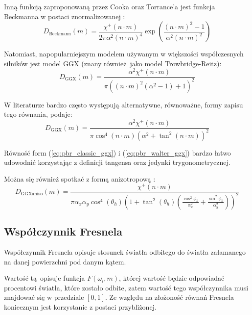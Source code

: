\documentclass[../main.tex]{subfiles}
\begin{document}
Inną funkcją zaproponowaną przez Cooka oraz Torrance'a jest funkcja Beckmanna \cite{CookTorrance} w postaci znormalizowanej \cite{pbr_background}:
\begin{equation}
  D_{\text{Beckmann}}(m) =
    \frac{\chi^{+}(n \cdot m)}{2\pi\alpha^2 (n \cdot m)^{4}}
    \exp\left(
      \frac{
        (n \cdot m)^2 - 1
      }{
        \alpha^2 (n \cdot m)^2
      }
    \right)
\end{equation}

Natomiast, napopularniejszym modelem używanym w większości współczesnych silników jest model GGX (znany również jako model Trowbridge-Reitz):
\begin{equation}
  D_{\text{GGX}}(m) =
    \frac{
      \alpha^2 \chi^{+}(n \cdot m)
    }{
      \pi \left(
        \left(n \cdot m \right)^{2}
        \left(\alpha^2 - 1 \right)
        + 1
      \right)^2
    }
\label{eq:pbr_classic_ggx}
\end{equation}

W literaturze bardzo często występują alternatywne, równoważne, formy zapisu
tego równania, \cite{WalterMicrofacetModels} podaje:
\begin{equation}
  D_{\text{GGX}}(m) =
    \frac{\alpha^2 \chi^{+}(n \cdot m)}{
      \pi \cos^{4} (n \cdot m) \left( \alpha^2 + \tan^2 (n \cdot m) \right)^2
    }
\label{eq:pbr_walter_ggx}
\end{equation}

\noindent Równość form (\ref{eq:pbr_classic_ggx}) i (\ref{eq:pbr_walter_ggx})  bardzo łatwo udowodnić korzystając z definicji tangensa oraz jedynki trygonometrycznej.

Można się również spotkać z formą anizotropową \cite{pbrt}:
\begin{equation}
  D_{\text{GGXaniso}}(m) =
    \frac{\chi^{+}(n \cdot m)}{
      \pi \alpha_x \alpha_y \cos^{4} (\theta_h) \left(
        1 + \tan^{2}(\theta_h) \left(
          \frac{\cos^{2}{\phi_h}}{\alpha_{x}^{2}} +
          \frac{\sin^{2}{\phi_h}}{\alpha_{y}^{2}}
        \right)
      \right)^{2}
    }
\end{equation}

\subsection{Współczynnik Fresnela}

Współczynnik Fresnela opisuje stosunek światła odbitego do światła załamanego
na danej powierzchni pod danym kątem.

Wartość tą opisuje funkcja $F(\omega_i,m)$, której wartość będzie odpowiadać
procentowi światła, które zostało odbite, zatem wartość tego współczynnika musi
znajdować się w przedziale $[0,1]$. Ze względu na złożoność równań Fresnela
koniecznym jest korzystanie z postaci przybliżonej. 
\end{document}
